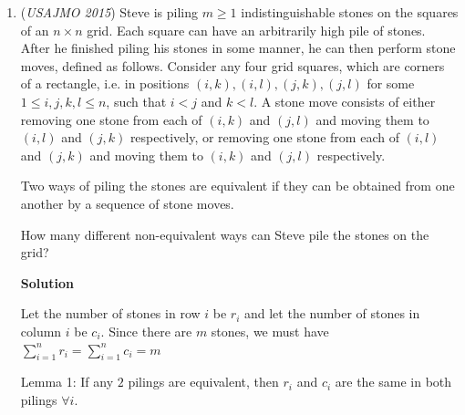 \begin{enumerate}
\textbf{Solution 2}

All angles are directed. Note that lines $AC, AX$ are isogonal in $\triangle ABD$ and $CD, CE$ are isogonal in $\triangle CDB$. From the law of sines it follows that 

 
 \[\frac{DX}{XB}\cdot \frac{DE}{ED}=\left(\frac{AD}{DB}\right)^2=\left(\frac{DC}{BC}\right)^2.\]

 Therefore, the ratio equals $\frac{AD\cdot DC}{DB\cdot BC}.$

 Now let $Y$ be a point of $AC$ such that $\angle{ABE}=\angle{CBY}$. We apply the above identities for $Y$ to get that $\frac{CY}{YA}\cdot \frac{CE}{EA}=\left(\frac{CD}{DA}\right)^2$. So $\angle{CDY}=\angle{EDA}$, the converse follows since all our steps are reversible.

 
Beware that directed angles, or angles $\bmod$ $180$, are not standard olympiad material. If you use them, provide a definition.

 


	\item (\textit{USAJMO 2015}) Steve is piling $m\geq 1$ indistinguishable stones on the squares of an $n\times n$ grid. Each square can have an arbitrarily high pile of stones. After he finished piling his stones in some manner, he can then perform stone moves, defined as follows. Consider any four grid squares, which are corners of a rectangle, i.e. in positions $(i, k), (i, l), (j, k), (j, l)$ for some $1\leq i, j, k, l\leq n$, such that $i<j$ and $k<l$. A stone move consists of either removing one stone from each of $(i, k)$ and $(j, l)$ and moving them to $(i, l)$ and $(j, k)$ respectively, or removing one stone from each of $(i, l)$ and $(j, k)$ and moving them to $(i, k)$ and $(j, l)$ respectively.


 Two ways of piling the stones are equivalent if they can be obtained from one another by a sequence of stone moves.


 How many different non-equivalent ways can Steve pile the stones on the grid?


 



\textbf{Solution}

Let the number of stones in row $i$ be $r_i$ and let the number of stones in column $i$ be $c_i$. Since there are $m$ stones, we must have $\sum_{i=1}^n r_i=\sum_{i=1}^n c_i=m$

 Lemma 1: If any $2$ pilings are equivalent, then $r_i$ and $c_i$ are the same in both pilings $\forall i$.


\end{enumerate}
